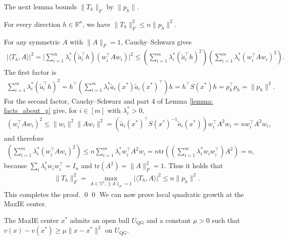 \documentclass[smallextended]{svjour3}
\let\springerproof\proof
\let\endspringerproof\endproof
\renewenvironment{proof}{\springerproof}{%
  \ifhmode\qed\else\leavevmode\qed\fi\endspringerproof}
\newcommand{\R}{\mathbb{R}}
\newcommand{\tr}{\mathrm{tr}}
\renewcommand{\S}{\mathbb{S}}
\begin{document}
The next lemma bounds $\|T_h\|_F$ by $\|p_h\|$.
\begin{lemma}\label{lemma: control_Th_by_ph}
    For every direction $h\in \R^n$, we have  $\|T_h\|^2_F \leq n\|p_h\|^2$.
\end{lemma}
\begin{proof}
    For any symmetric $A$ with $\|A\|_F=1$, Cauchy--Schwarz gives
    \begin{align*}
        |\langle T_h, A\rangle|^2 =  \Bigg|\sum_{i=1}^m \lambda_i^*(\tilde{a}_i^{\top} h)(w_i^\top A w_i)\Bigg|^2\leq  \left(\sum_{i=1}^m \lambda_i^* (\tilde{a}_i^{\top} h)^2\right)\left(\sum_{i=1}^m \lambda_i^* (w_i^\top A w_i)^2\right).
    \end{align*}
    The first factor is
    \begin{align*}
        \sum_{i=1}^m \lambda_i^* (\tilde{a}_i^{\top} h)^2 = h^\top \left(\sum_{i=1}^m \lambda_i^*\tilde{a}_i(x^*)\tilde{a}_i(x^*)^\top\right)h = h^\top S(x^*)h = p_h^\top p_h =\|p_h\|^2.
    \end{align*}
    For the second factor, Cauchy--Schwarz and part 4 of Lemma \ref{lemma: facts_about_g} give, for $i\in[m]$ with $\lambda_i^*>0$,
    \begin{align*}
        (w_i^\top A w_i)^2 \leq \|w_i\|^2\|Aw_i\|^2
        = (\tilde{a}_i(x^*)^\top S(x^*)^{-1}\tilde{a}_i(x^*)) w_i^\top A^2 w_i = nw_i^\top A^2 w_i,
    \end{align*}
    and therefore
    \begin{align*}
        \left(\sum_{i=1}^m \lambda_i^* (w_i^\top A w_i)^2\right)\leq  n \sum_{i=1}^m \lambda_i^* w_i^\top A^2 w_i= n \tr\left(\left(\sum_{i=1}^m\lambda_i^* w_iw_i^\top\right)A^2 \right) = n,
    \end{align*}
    because $\sum_i\lambda_i^*w_iw_i^\top=I_n$ and $\tr(A^2)=\|A\|_F^2=1$.
    Thus it holds that 
    \begin{align*}
        \|T_h\|_F^2 = \max_{A\in\S^n,\|A\|_F=1} |\langle T_h, A\rangle|^2 \leq n\|p_h\|^2.
    \end{align*}
    This completes the proof. 
\end{proof}
We can now prove local quadratic growth at the MaxIE center.
\begin{proposition}\label{prop: local_quadratic_growth}
    The MaxIE center $x^*$ admits an open ball $U_{\mathrm{QG}}$ and a constant $\mu >0$ such that $v(x) -v(x^*) \geq\mu\|x-x^*\|^2$ on $U_{\mathrm{QG}}$.
\end{proposition}
\end{document}

